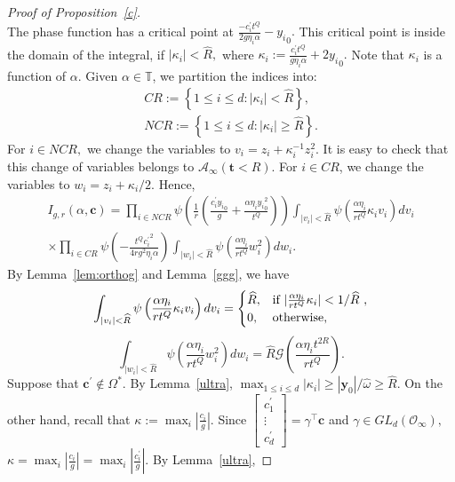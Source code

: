 \documentclass[11pt]{amsart}
\theoremstyle{plain}
\theoremstyle{plain}
\renewcommand{\vec}[1]{\mathbf{#1}}
\theoremstyle{remark}
\theoremstyle{definition}
\renewcommand{\hat}{\widehat}
\newcommand{\hR}{\widehat{R}}
\newcommand{\TT}{\mathbb{T}}
\newcommand{\cA}{\mathcal{A}}
\newcommand{\cO}{\mathcal{O}}
\newcommand{\cG}{\mathcal{G}}
\begin{document}
\begin{proof}[Proof of Proposition~\ref{c}]
\[ \] 
 The phase function has a critical point at $\frac{-c^{\prime}_i t^Q}{2g\eta_i \alpha}-{y_i}_0.$ This critical point is inside the domain of the integral, if 
 $|\kappa_i|<\hR,$ where $\kappa_i:=\frac{c^{\prime}_i t^Q}{g\eta_i \alpha}+2{y_i}_0.$ Note that $\kappa_i$ is a function of $\alpha.$   Given $\alpha\in\TT$, we partition the indices into: 
\begin{equation*}
\begin{split}
CR:=\left\{1\leq i\leq d: |\kappa_i|<\hR  \right\},
\\
NCR:=\left\{1\leq i\leq d: |\kappa_i|\geq \hR \right\}.
\end{split}
\end{equation*}
For $i\in NCR,$ we change the variables to 
\(
v_i=z_i + \kappa_i^{-1} z_i^2
\). It is easy to check that this change of variables belongs to $\cA_{\infty}(\vec{t}<R).$ For $i\in CR$, we change the variables to  $w_i= z_i+\kappa_i/2.$   Hence,
\begin{equation}\label{oceq1}
\begin{split}
I_{g,r}(\alpha,\vec{c})= \prod_{i\in NCR} \psi \left( \frac{1}{r} \left( \frac{c_i^{\prime}{y_i}_0}{g} +\frac{\alpha  \eta_i {y_i}_0^2}{t^Q}   \right)\right)  \int_{|v_i|<\hR}\psi\left(  \frac{\alpha \eta_i }{rt^{Q}} \kappa_i v_i \right) dv_{i}
\\
\times \prod_{i\in CR}\psi (-\frac{t^Q{c_i^{\prime}}^2}{4rg^2\eta_i \alpha}) \int_{|w_i|<\hR}\psi
\left( \frac{\alpha \eta_i }{rt^{Q}}w_i^2  \right) dw_i.
\end{split}
\end{equation}
By Lemma~\ref{lem:orthog} and  Lemma~\ref{ggg}, we have 
\begin{equation}\label{osceq2}
\int_{|v_i|<\hR}\psi\left(    \frac{\alpha \eta_i }{rt^{Q}} \kappa_i v_i   \right) dv_{i}=\begin{cases}
\hR, &\mbox{if $ |\frac{\alpha \eta_i }{rt^{Q}} \kappa_i | <1/\hR$  },\\
0, &\mbox{otherwise,}
\end{cases}
\end{equation}
\[
 \int_{|w_i|<\hR}\psi
\left( \frac{\alpha \eta_i }{rt^{Q}}w_i^2  \right) dw_i=\hR\cG\left(\frac{\alpha \eta_i t^{2R}}{rt^Q}\right).
\]
Suppose that $\vec{c}^{\prime}\notin\Omega^*.$ By Lemma~\ref{ultra}, 
\(
 \max_{1\leq i\leq d}|\kappa_i| \geq |\vec{y}_0|/\hat{\omega} \geq \hR.
\)
 On the other hand, recall that  $\kappa:=\max_{i} |\frac{c_i}{g }|.$  Since $\begin{bmatrix}c_1^{\prime} \\ \vdots \\c_d^{\prime}  \end{bmatrix}=\gamma^{\intercal } \vec{c}$ and $\gamma\in GL_d(\cO_{\infty}),$ $\kappa=\max_{i} |\frac{c_i}{g }|=\max_{i} |\frac{c_i^{\prime}}{g }|.$   By Lemma~\ref{ultra}, 

\end{proof}
\end{document}
